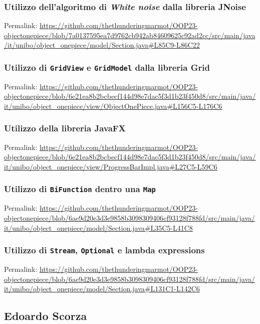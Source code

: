 \documentclass[a4paper,12pt]{report}
\begin{document}
\subsubsection{Utilizzo dell'algoritmo di \textit{White noise} dalla libreria JNoise}

Permalink: \url{https://github.com/thethunderingmarmot/OOP23-objectonepiece/blob/7a0137595ea7d9762cb942ab84609625c92ad2cc/src/main/java/it/unibo/object_onepiece/model/Section.java#L85C9-L86C22}

\subsubsection{Utilizzo di \texttt{GridView} e \texttt{GridModel} dalla libreria Grid}

Permalink: \url{https://github.com/thethunderingmarmot/OOP23-objectonepiece/blob/6e21ea8b2bcbecf144d98e7dac5f3d1b23f450d8/src/main/java/it/unibo/object_onepiece/view/ObjectOnePiece.java#L156C5-L176C6}

\subsubsection{Utilizzo della libreria JavaFX}

Permalink: \url{https://github.com/thethunderingmarmot/OOP23-objectonepiece/blob/6e21ea8b2bcbecf144d98e7dac5f3d1b23f450d8/src/main/java/it/unibo/object_onepiece/view/ProgressBarImpl.java#L27C5-L59C6}

\subsubsection{Utilizzo di \texttt{BiFunction} dentro una \texttt{Map}}

Permalink: \url{https://github.com/thethunderingmarmot/OOP23-objectonepiece/blob/6ae9d20e3d3e9858b3098309406cf93128f788fd/src/main/java/it/unibo/object_onepiece/model/Section.java#L35C5-L41C8}

\subsubsection{Utilizzo di \texttt{Stream}, \texttt{Optional} e lambda expressions}

Permalink: \url{https://github.com/thethunderingmarmot/OOP23-objectonepiece/blob/6ae9d20e3d3e9858b3098309406cf93128f788fd/src/main/java/it/unibo/object_onepiece/model/Section.java#L131C1-L142C6}

\subsection*{Edoardo Scorza}
\end{document}
